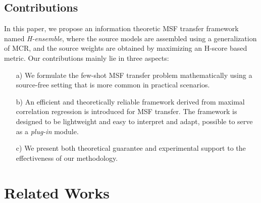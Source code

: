 \documentclass[letterpaper]{article} %
\begin{document}
\subsection{Contributions}
In this paper, we propose an information theoretic MSF transfer framework named \textit{H-ensemble}, where the source models are assembled using a generalization of MCR, and the source weights are obtained by maximizing an H-score based metric. 
Our contributions mainly lie in three aspects: 


\begin{itemize}
    \item[a)] We formulate the few-shot MSF transfer problem mathematically using a source-free setting that is more common in practical scenarios.
    
        
    \item[b)] An efficient and theoretically reliable framework derived from maximal correlation regression is introduced for MSF transfer. The framework is designed to be lightweight and easy to interpret and adapt, possible to serve as a \textit{plug-in} module. 
    
    \item[c)] We present both theoretical guarantee and experimental support to the effectiveness of our methodology.

    
\end{itemize}

\section{Related Works}
\end{document}
